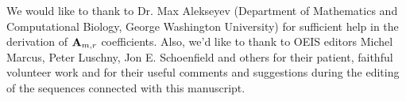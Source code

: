 We would like to thank to Dr. Max Alekseyev (Department of Mathematics and Computational Biology,
George Washington University) for sufficient help in the derivation of ${\mathbf{A}} \sb{m,r}$ coefficients.
Also, we'd like to thank to OEIS editors Michel Marcus, Peter Luschny, Jon E. Schoenfield and others
for their patient, faithful volunteer work and for their useful comments and suggestions during the
editing of the sequences connected with this manuscript.
